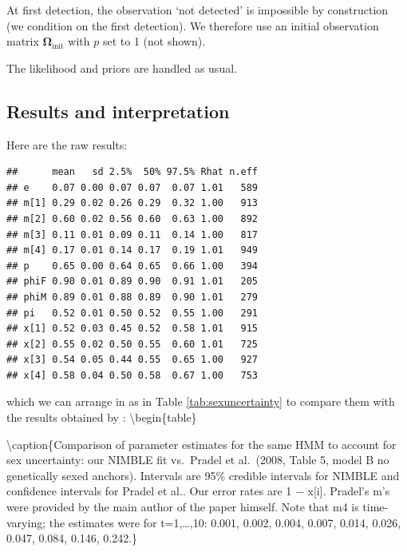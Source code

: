 \documentclass[
  12pt,
]{krantz}
\begin{document}
At first detection, the observation `not detected' is impossible by construction (we condition on the first detection). We therefore use an initial observation matrix \(\mathbf{\Omega}_{\text{init}}\) with \(p\) set to 1 (not shown).

The likelihood and priors are handled as usual.

\subsection{Results and interpretation}\label{results-and-interpretation-2}

Here are the raw results:

\begin{verbatim}
##      mean   sd 2.5%  50% 97.5% Rhat n.eff
## e    0.07 0.00 0.07 0.07  0.07 1.01   589
## m[1] 0.29 0.02 0.26 0.29  0.32 1.00   913
## m[2] 0.60 0.02 0.56 0.60  0.63 1.00   892
## m[3] 0.11 0.01 0.09 0.11  0.14 1.00   817
## m[4] 0.17 0.01 0.14 0.17  0.19 1.01   949
## p    0.65 0.00 0.64 0.65  0.66 1.00   394
## phiF 0.90 0.01 0.89 0.90  0.91 1.01   205
## phiM 0.89 0.01 0.88 0.89  0.90 1.01   279
## pi   0.52 0.01 0.50 0.52  0.55 1.00   291
## x[1] 0.52 0.03 0.45 0.52  0.58 1.01   915
## x[2] 0.55 0.02 0.50 0.55  0.60 1.01   725
## x[3] 0.54 0.05 0.44 0.55  0.65 1.00   927
## x[4] 0.58 0.04 0.50 0.58  0.67 1.00   753
\end{verbatim}

which we can arrange in as in Table \ref{tab:sexuncertainty} to compare them with the results obtained by \citet{pradel2008sex}:
\textbackslash begin\{table\}

\textbackslash caption\{\label{tab:sexuncertainty}Comparison of parameter estimates for the same HMM to account for sex uncertainty: our NIMBLE fit vs.~Pradel et al.~(2008, Table 5, model B no genetically sexed anchors). Intervals are 95\% credible intervals for NIMBLE and confidence intervals for Pradel et al.. Our error rates are 1 − x{[}i{]}. Pradel's m's were provided by the main author of the paper himself. Note that m4 is time-varying; the estimates were for t=1,\ldots,10: 0.001, 0.002, 0.004, 0.007, 0.014, 0.026, 0.047, 0.084, 0.146, 0.242.\}
\centering
\end{document}
